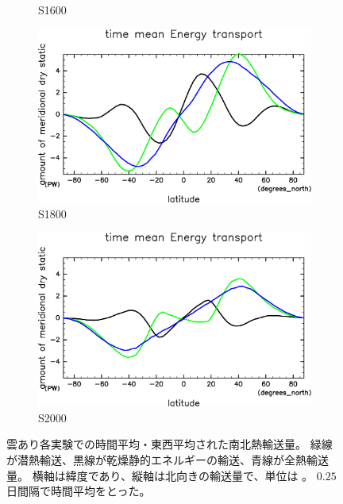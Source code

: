 \documentclass[body]{subfiles}
\begin{document}
\begin{figure}[t]
\begin{subfigure}{.4\textwidth}
		\caption{S1600}\label{EnFlxS1600}
	\end{subfigure}
	\begin{subfigure}{.4\textwidth}
		\centering
		\includegraphics[width=\textwidth]{S1800/EngyFlx,time=3650:4015-crop-rotate.pdf}
		\caption{S1800}\label{EnFlxS1800}
	\end{subfigure}
	\begin{subfigure}{.4\textwidth}
		\centering
		\includegraphics[width=\textwidth]{S2000/EngyFlx,time=7300:7665-crop-rotate.pdf}
		\caption{S2000}\label{EnFlxS2000}
	\end{subfigure}
	\caption[雲あり各実験での南北熱輸送量]{
		雲あり各実験での時間平均・東西平均された南北熱輸送量。
		緑線が潜熱輸送、黒線が乾燥静的エネルギーの輸送、青線が全熱輸送量。
		横軸は緯度であり、縦軸は北向きの輸送量で、単位は 。
		\(0.25\) 日間隔で時間平均をとった。
	}\label{EnFlx}
\end{figure}

\afterpage{\clearpage}
\end{document}
